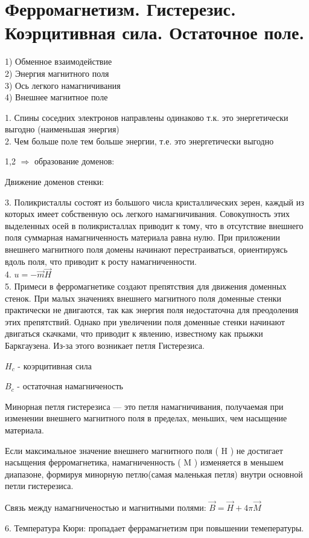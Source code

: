 \section{Ферромагнетизм. Гистерезис. Коэрцитивная сила. Остаточное поле.}

1) Обменное взаимодействие \\
2) Энергия магнитного поля \\
3) Ось легкого намагничивания \\
4) Внешнее магнитное поле 

1. Спины соседних электронов направлены одинаково т.к. это энергетически выгодно (наименьшая энергия) \\
2. Чем больше поле тем больше энергии, т.е. это энергетически выгодно 

1,2 \( \Rightarrow \) образование доменов: 


\newpage

Движение доменов стенки:


3. Поликристаллы состоят из большого числа кристаллических зерен, каждый из которых имеет собственную ось легкого намагничивания. Совокупность этих выделенных осей в поликристаллах приводит к тому, что в отсутствие внешнего поля суммарная намагниченность материала равна нулю. При приложении внешнего магнитного поля домены начинают перестраиваться, ориентируясь вдоль поля, что приводит к росту намагниченности. \\
4. \( u=-\vec{m}\vec{H} \) \\
5. Примеси в ферромагнетике создают препятствия для движения доменных стенок. При малых значениях внешнего магнитного поля доменные стенки практически не двигаются, так как энергия поля недостаточна для преодоления этих препятствий. Однако при увеличении поля доменные стенки начинают двигаться скачками, что приводит к явлению, известному как прыжки Баркгаузена. 
Из-за этого возникает петля Гистерезиса.


\( H_c \) - коэрцитивная сила

\( B_c \) - остаточная намагниченость 

Минорная петля гистерезиса — это петля намагничивания, получаемая при изменении внешнего магнитного поля в пределах, меньших, чем насыщение материала.

Если максимальное значение внешнего магнитного поля ( H ) не достигает насыщения ферромагнетика, намагниченность ( M ) изменяется в меньшем диапазоне, формируя минорную петлю(самая маленькая петля) внутри основной  петли гистерезиса.

Связь между намагниченостью и магнитными полями: \( \vec{B}=\vec{H}+4\pi \vec{M} \) 

6. Температура Кюри: пропадает феррамагнетизм при повышении темепературы.

